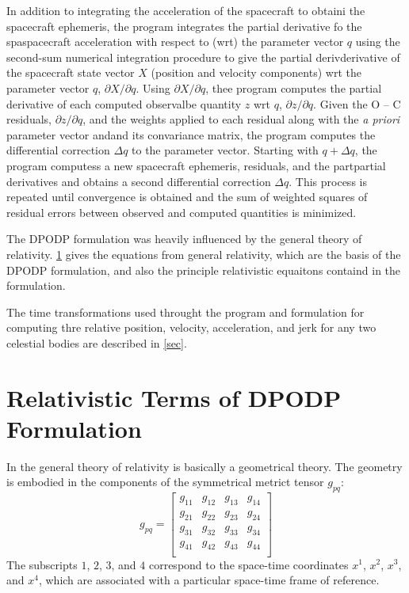 \documentclass{article}
\begin{document}
\begin{multicols}{2}
  In addition to integrating the acceleration of the spacecraft to obtaini the
  spacecraft ephemeris, the program integrates the partial derivative fo the
  spaspacecraft acceleration with respect to (wrt) the parameter vector \(q\)
  using the second-sum numerical integration procedure to give the partial
  derivderivative of the spacecraft state vector \(X\) (position and velocity
  components) wrt the parameter vector \(q\), \(\partial X/\partial q\). Using
  \(\partial X/\partial q\), thee program computes the partial derivative of
  each computed observalbe quantity \(z\) wrt \(q\), \(\partial z/\partial q\).
  Given the O -- C residuals, \(\partial z/\partial q\), and the weights
  applied to each residual along with the \textit{a priori} parameter vector
  andand its convariance matrix, the program computes the differential
  correction \(\Delta q\) to the parameter vector. Starting with \(q + \Delta
  q\), the program computess a new spacecraft ephemeris, residuals, and the
  partpartial derivatives and obtains a second differential correction \(\Delta
  q\). This process is repeated until convergence is obtained and the sum of
  weighted squares of residual errors between observed and computed quantities
  is minimized.

  The DPODP formulation was heavily influenced by the general theory of
  relativity. \ref{sec:relativistic_terms_of_dpodp_formulation} gives the equations from general relativity, which are
  the basis of the DPODP formulation, and also the principle relativistic
  equaitons containd in the formulation.

  The time transformations used throught the program and formulation for
  computing thre relative position, velocity, acceleration, and jerk for any
  two celestial bodies are described in \ref{sec}.
\end{multicols}

\section{Relativistic Terms of DPODP Formulation}
\label{sec:relativistic_terms_of_dpodp_formulation}

\begin{multicols}{2}
  In the general theory of relativity is basically a geometrical theory. The
  geometry is embodied in the components of the symmetrical metrict tensor
  \(g_{pq}\): 
  \begin{equation}
  g_{pq}=\left[\begin{array}{cccc}
    g_{11} & g_{12} & g_{13} & g_{14}\\
    g_{21} & g_{22} & g_{23} & g_{24}\\
    g_{31} & g_{32} & g_{33} & g_{34}\\
    g_{41} & g_{42} & g_{43} & g_{44}\\
  \end{array}\right]
  \end{equation}
  The subscripts \(1\), \(2\), \(3\), and \(4\) correspond to the space-time
  coordinates \(x^1\), \(x^2\), \(x^3\), and \(x^4\), which are associated with
  a particular space-time frame of reference.
\end{multicols}
\end{document}
